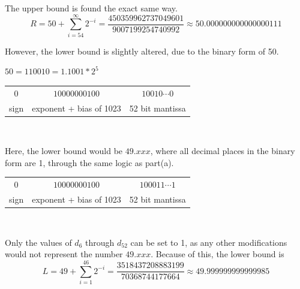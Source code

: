 	The upper bound is found the exact same way.
	$$R = 50 + \sum_{i=54}^{\infty}2^{-i} = \frac{450359962737049601}{9007199254740992} \approx 50.000000000000000111$$

	However, the lower bound is slightly altered, due to the binary form of 50.

	$50 = 110010 = 1.1001*2^5$ \\

	\begin{center}
	\begin{tabular}{c | c | c}

		$0$ & $10000000100$ & $10010\cdots0$ \\

		sign & exponent + bias of 1023 & 52 bit mantissa \\

	\end{tabular} \\
	\end{center}

	Here, the lower bound would be $49.xxx$, where all decimal places in the binary form are 1, through the same logic as part(a). \\

	\begin{center}
	\begin{tabular}{c | c | c}

		$0$ & $10000000100$ & $100011\cdots1$ \\

		sign & exponent + bias of 1023 & 52 bit mantissa \\

	\end{tabular} \\
	\end{center}

	Only the values of $d_6$ through $d_{52}$ can be set to 1, as any other modifications would not represent the number $49.xxx$.
	Because of this, the lower bound is
	$$L = 49 + \sum_{i = 1}^{46}2^{-i} = \frac{3518437208883199}{70368744177664} \approx 49.999999999999985$$

\eenum

\item

